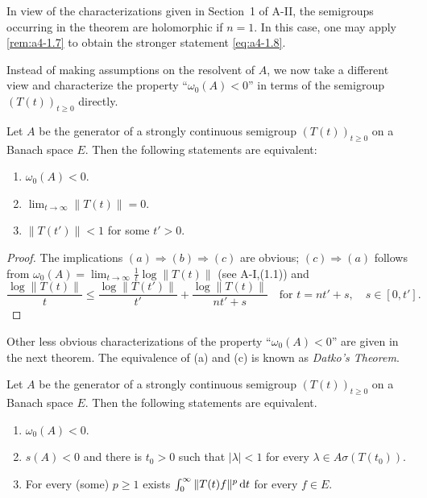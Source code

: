 In view of the characterizations given in Section~1 of A-II, the semigroups occurring in the theorem are holomorphic if $ n = 1 $. 
In this case, one may apply \eqref{rem:a4-1.7} to obtain the stronger statement \eqref{eq:a4-1.8}.

Instead of making assumptions on the resolvent of $ A $, we now take a different view and characterize the property \enquote{$ \omega_{0}(A) < 0 $} in terms of the semigroup $ (T(t))_{t \geq 0} $ directly.
\begin{proposition} \label{prop:a4-1.10} Let $ A $ be the generator of a strongly continuous semigroup $ (T(t))_{t \geq 0} $ on a Banach space $E$. 
Then the following statements are equivalent:
\begin{enumerate}[\upshape (a)]
\item  
$ \omega_{0}(A) < 0 $.
\item  
$ \lim_{t \to \infty} \| T(t) \| = 0 $.
\item  
$ \| T(t') \| < 1 $ for some $ t' > 0 $.
\end{enumerate}
\end{proposition}
\begin{proof}
The implications $(a)  \Rightarrow  (b)  \Rightarrow  (c) $ are obvious; $(c)  \Rightarrow  (a) $ follows from  $\omega_{0}(A) = \lim_{t \to \infty} \frac{1}{t} \log \| T(t) \|$ (see A-I,(1.1)) and  
\[
\displaystyle
\frac{\log \|T(t)\|}{t} \leq \frac{\log \|T(t')\|}{t'} + \frac{\log \|T(t)\|}{nt' + s} \quad \text{for } t = nt' + s, \quad s \in [0,t'].
\]
\end{proof}
Other less obvious characterizations of the property 
\enquote{$ \omega_{0}(A) < 0 $} are given in the next theorem. 
The equivalence of (a) and (c) is known as \emph{Datko’s Theorem}.
\begin{theorem} \label{thm:a4-1.11} 
Let $ A $ be the generator of a strongly continuous semigroup $ (T(t))_{t \geq 0} $ on a Banach space $ E $. 
Then the following statements are equivalent.
\begin{enumerate}[\upshape (a)]
\item
$ \omega_{0}(A) < 0 $.
\item
$ s(A) < 0 $ and there is $ t_0 > 0 $ such that  
$ |\lambda| < 1$ for every $ \lambda \in A\sigma (T(t_0)).$
\item
For every (some) $ p \geq 1 $ exists $ \int_{0}^{\infty} \| T(t) f \|^p\mathop{}\!\mathrm{d}{t} $ for every $ f \in E $.
\end{enumerate}
\end{theorem}

